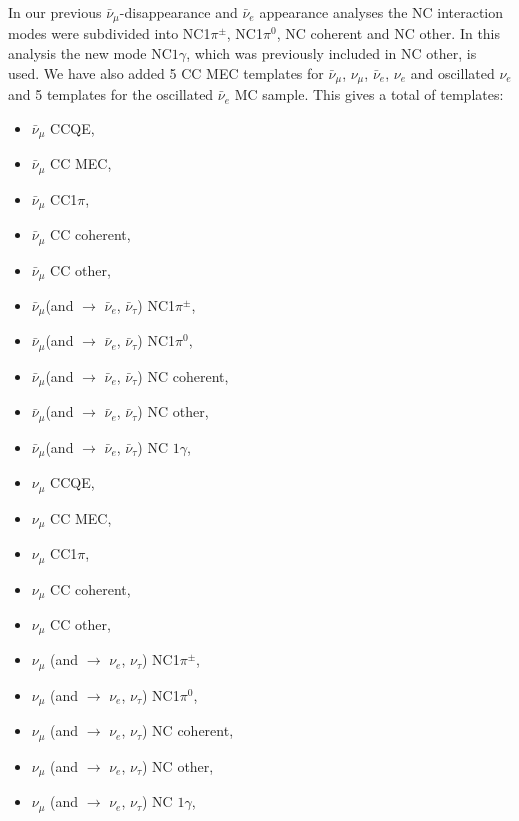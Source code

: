 In our previous $\bar{\nu}_{\mu}$-disappearance and $\bar{\nu}_e$ appearance analyses
the NC interaction modes were subdivided into 
NC1$\pi^{\pm}$, NC1$\pi^{0}$, NC coherent and NC other. 
In this analysis the new mode NC$1\gamma$, which was previously included in NC other, is used.
We have also added 5 CC MEC templates for $\bar{\nu}_{\mu}$, $\nu_{\mu}$, $\bar{\nu}_{e}$, 
$\nu_{e}$ and oscillated $\nu_{e}$ and 5 templates for the oscillated $\bar{\nu}_{e}$ MC sample. This gives a 
total of \NMCTemplate{} templates: 
\begin{itemize}
\item  $\bar{\nu}_{\mu}$ CCQE,
\item  $\bar{\nu}_{\mu}$ CC MEC,
\item  $\bar{\nu}_{\mu}$ CC1$\pi$,
\item  $\bar{\nu}_{\mu}$ CC coherent,
\item  $\bar{\nu}_{\mu}$ CC other,
\item  $\bar{\nu}_{\mu}$(and $\rightarrow$ $\bar{\nu}_{e}$, $\bar{\nu}_{\tau}$) NC1$\pi^{\pm}$,
\item  $\bar{\nu}_{\mu}$(and $\rightarrow$ $\bar{\nu}_{e}$, $\bar{\nu}_{\tau}$) NC1$\pi^{0}$,
\item  $\bar{\nu}_{\mu}$(and $\rightarrow$ $\bar{\nu}_{e}$, $\bar{\nu}_{\tau}$) NC coherent,
\item  $\bar{\nu}_{\mu}$(and $\rightarrow$ $\bar{\nu}_{e}$, $\bar{\nu}_{\tau}$) NC other,
\item  $\bar{\nu}_{\mu}$(and $\rightarrow$ $\bar{\nu}_{e}$, $\bar{\nu}_{\tau}$) NC $1\gamma$,

\item  $\nu_{\mu}$ CCQE,
\item  $\nu_{\mu}$ CC MEC,
\item  $\nu_{\mu}$ CC1$\pi$, 
\item  $\nu_{\mu}$ CC coherent, 
\item  $\nu_{\mu}$ CC other, 
\item  $\nu_{\mu}$ (and $\rightarrow$ $\nu_{e}$, $\nu_{\tau}$) NC1$\pi^{\pm}$, 
\item  $\nu_{\mu}$ (and $\rightarrow$ $\nu_{e}$, $\nu_{\tau}$) NC1$\pi^{0}$,
\item  $\nu_{\mu}$ (and $\rightarrow$ $\nu_{e}$, $\nu_{\tau}$) NC coherent,
\item  $\nu_{\mu}$ (and $\rightarrow$ $\nu_{e}$, $\nu_{\tau}$) NC other, 
\item  $\nu_{\mu}$ (and $\rightarrow$ $\nu_{e}$, $\nu_{\tau}$) NC $1\gamma$, 


\end{itemize}
